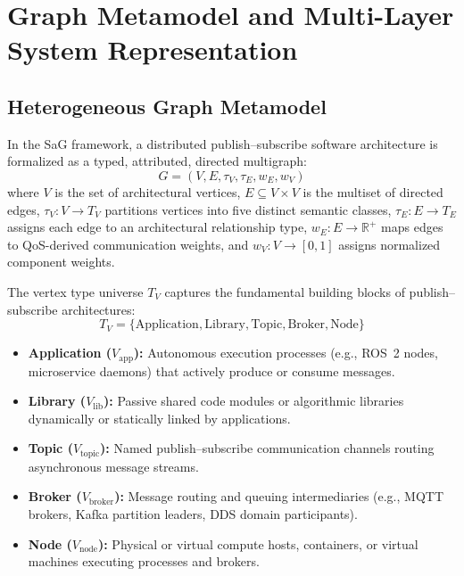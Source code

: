 \section{Graph Metamodel and Multi-Layer System Representation}
\label{sec:sag_model}

\subsection{Heterogeneous Graph Metamodel}
\label{sec:model:formulation}

In the SaG framework, a distributed publish--subscribe software architecture is formalized as a typed, attributed, directed multigraph:
\begin{equation}
G = (V, E, \tau_V, \tau_E, w_E, w_V)
\end{equation}
where $V$ is the set of architectural vertices, $E \subseteq V \times V$ is the multiset of directed edges, $\tau_V : V \to T_V$ partitions vertices into five distinct semantic classes, $\tau_E : E \to T_E$ assigns each edge to an architectural relationship type, $w_E : E \to \mathbb{R}^+$ maps edges to QoS-derived communication weights, and $w_V : V \to [0,1]$ assigns normalized component weights.

The vertex type universe $T_V$ captures the fundamental building blocks of publish--subscribe architectures:
\begin{equation}
T_V = \{\text{Application}, \text{Library}, \text{Topic}, \text{Broker}, \text{Node}\}
\end{equation}
\begin{itemize}
    \item \textbf{Application ($V_{\text{app}}$):} Autonomous execution processes (e.g., ROS~2 nodes, microservice daemons) that actively produce or consume messages.
    \item \textbf{Library ($V_{\text{lib}}$):} Passive shared code modules or algorithmic libraries dynamically or statically linked by applications.
    \item \textbf{Topic ($V_{\text{topic}}$):} Named publish--subscribe communication channels routing asynchronous message streams.
    \item \textbf{Broker ($V_{\text{broker}}$):} Message routing and queuing intermediaries (e.g., MQTT brokers, Kafka partition leaders, DDS domain participants).
    \item \textbf{Node ($V_{\text{node}}$):} Physical or virtual compute hosts, containers, or virtual machines executing processes and brokers.
\end{itemize}

